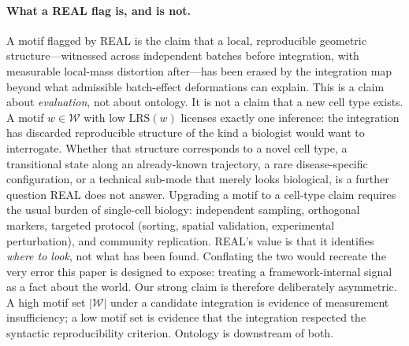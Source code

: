 \paragraph*{What a REAL flag is, and is not.}
A motif flagged by REAL is the claim that a local, reproducible geometric structure---witnessed across independent batches before integration, with measurable local-mass distortion after---has been erased by the integration map beyond what admissible batch-effect deformations can explain. This is a claim about \emph{evaluation}, not about ontology. It is not a claim that a new cell type exists. A motif $w \in \mathcal{W}$ with low $\mathrm{LRS}(w)$ licenses exactly one inference: the integration has discarded reproducible structure of the kind a biologist would want to interrogate. Whether that structure corresponds to a novel cell type, a transitional state along an already-known trajectory, a rare disease-specific configuration, or a technical sub-mode that merely looks biological, is a further question REAL does not answer. Upgrading a motif to a cell-type claim requires the usual burden of single-cell biology: independent sampling, orthogonal markers, targeted protocol (sorting, spatial validation, experimental perturbation), and community replication. REAL's value is that it identifies \emph{where to look}, not what has been found. Conflating the two would recreate the very error this paper is designed to expose: treating a framework-internal signal as a fact about the world. Our strong claim is therefore deliberately asymmetric. A high motif set $|\mathcal{W}|$ under a candidate integration is evidence of measurement insufficiency; a low motif set is evidence that the integration respected the syntactic reproducibility criterion. Ontology is downstream of both.


